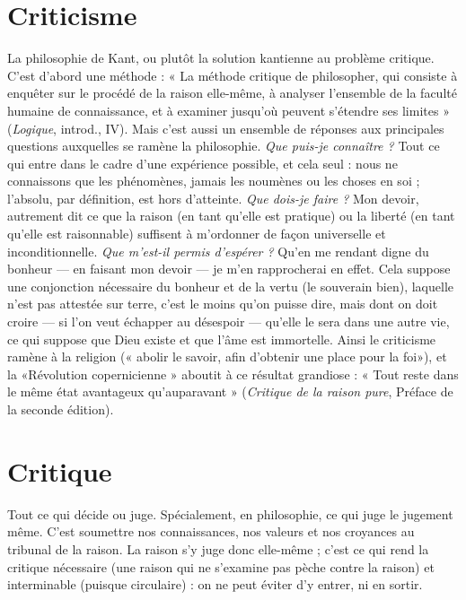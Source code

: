 \section{Criticisme}
La philosophie de Kant, ou plutôt la solution kantienne au
problème critique. C’est d’abord une méthode : « La méthode
critique de philosopher, qui consiste à enquêter sur le procédé de la raison elle-même,
à analyser l’ensemble de la faculté humaine de connaissance, et à examiner
jusqu'où peuvent s'étendre ses limites » ({\it Logique}, introd., IV). Mais c’est
aussi un ensemble de réponses aux principales questions auxquelles se ramène
la philosophie. {\it Que puis-je connaître ?} Tout ce qui entre dans le cadre d’une
expérience possible, et cela seul : nous ne connaissons que les phénomènes,
jamais les noumènes ou les choses en soi ; l'absolu, par définition, est hors
d'atteinte. {\it Que dois-je faire ?} Mon devoir, autrement dit ce que la raison (en
tant qu’elle est pratique) ou la liberté (en tant qu’elle est raisonnable) suffisent
à m'ordonner de façon universelle et inconditionnelle. {\it Que m'est-il permis
d'espérer ?} Qu’en me rendant digne du bonheur — en faisant mon devoir — je
m'en rapprocherai en effet. Cela suppose une conjonction nécessaire du bonheur
et de la vertu (le souverain bien), laquelle n’est pas attestée sur terre, c’est
le moins qu’on puisse dire, mais dont on doit croire — si l’on veut échapper au
désespoir — qu’elle le sera dans une autre vie, ce qui suppose que Dieu existe et
que l’âme est immortelle. Ainsi le criticisme ramène à la religion (« abolir le
savoir, afin d'obtenir une place pour la foi»), et la «Révolution
copernicienne » aboutit à ce résultat grandiose : « Tout reste dans le même état
avantageux qu'auparavant » ({\it Critique de la raison pure}, Préface de la seconde
édition).

\section{Critique}
Tout ce qui décide ou juge. Spécialement, en philosophie, ce
qui juge le jugement même. C’est soumettre nos connaissances,
nos valeurs et nos croyances au tribunal de la raison. La raison s’y juge
donc elle-même ; c’est ce qui rend la critique nécessaire (une raison qui ne
s’examine pas pèche contre la raison) et interminable (puisque circulaire) : on
ne peut éviter d’y entrer, ni en sortir.

